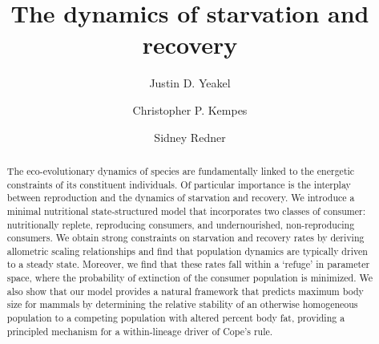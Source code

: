 \documentclass[twocolumn,preprintnumbers,amsmath,amssymb,superscriptaddress]{revtex4}
\begin{document}
\author{Justin D. Yeakel} 

\author{Christopher P. Kempes} 

\author{Sidney Redner} 

\title{The dynamics of starvation and recovery}%


\begin{abstract} %
The eco-evolutionary dynamics of species are fundamentally linked to the energetic constraints of its constituent individuals. 
Of particular importance is the interplay between reproduction and the dynamics of starvation and recovery. %
We introduce a minimal nutritional state-structured model that incorporates two classes of consumer: nutritionally replete, reproducing consumers, and undernourished, non-reproducing consumers. %
We obtain strong constraints on starvation and recovery rates by deriving allometric scaling relationships and find that population dynamics are typically driven to a steady state. %
Moreover, we find that these rates fall within a `refuge' in parameter space, where the probability of extinction of the consumer population is minimized. 
We also show that our model provides a natural framework that predicts
maximum body size for mammals by determining the relative stability of an
otherwise homogeneous population to a competing population with altered percent
body fat, providing a principled mechanism for a within-lineage driver of
Cope's rule.
\end{abstract}
\end{document}
